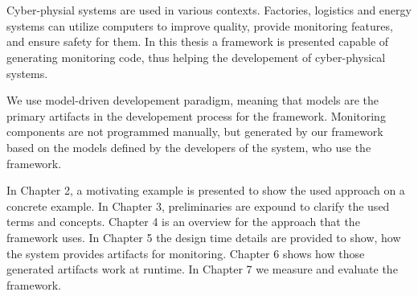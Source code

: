 \chapter{\bevezetes}

Cyber-physial systems are used in various contexts. Factories, logistics and energy systems can utilize computers to improve quality, provide monitoring features, and ensure safety for them. In this thesis a framework is presented capable of generating monitoring code, thus helping the developement of cyber-physical systems. 

We use model-driven developement paradigm, meaning that models are the primary artifacts in the developement process for the framework. Monitoring components are not programmed manually, but generated by our framework based on the models defined by the developers of the system, who use the framework. 

In Chapter 2, a motivating example is presented to show the used approach on a concrete example. In Chapter 3, preliminaries are expound to clarify the used terms and concepts. Chapter 4 is an overview for the approach that the framework uses. In Chapter 5 the design time details are provided to show, how the system provides artifacts for monitoring. Chapter 6 shows how those generated artifacts work at runtime. In Chapter 7 we measure and evaluate the framework.